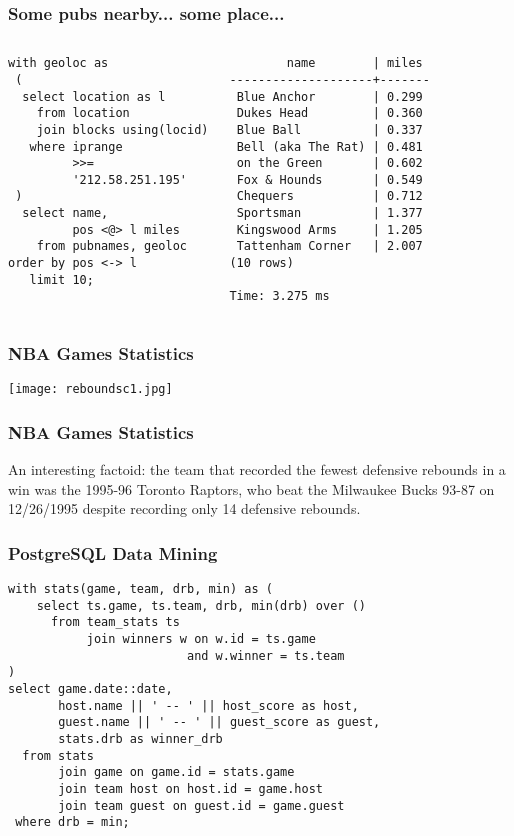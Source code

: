 \documentclass{beamer}
\begin{document}
\begin{frame}[fragile]
  \frametitle{Some pubs nearby... some place...}

\begin{columns}
\begin{verbatim}
with geoloc as
 (
  select location as l
    from location
    join blocks using(locid)
   where iprange
         >>=
         '212.58.251.195'
 )
  select name,
         pos <@> l miles
    from pubnames, geoloc
order by pos <-> l
   limit 10;
\end{verbatim}  
\begin{verbatim}
        name        | miles 
--------------------+-------
 Blue Anchor        | 0.299
 Dukes Head         | 0.360
 Blue Ball          | 0.337
 Bell (aka The Rat) | 0.481
 on the Green       | 0.602
 Fox & Hounds       | 0.549
 Chequers           | 0.712
 Sportsman          | 1.377
 Kingswood Arms     | 1.205
 Tattenham Corner   | 2.007
(10 rows)

Time: 3.275 ms
\end{verbatim}  
\end{columns}
\end{frame}

\begin{frame}
  \frametitle{NBA Games Statistics}

  \begin{center}
    \texttt{[image: reboundsc1.jpg]}
  \end{center}
\end{frame}

\begin{frame}
  \frametitle{NBA Games Statistics}

  An interesting factoid: the team that recorded the fewest defensive
  rebounds in a win was the 1995-96 Toronto Raptors, who beat the Milwaukee
  Bucks 93-87 on 12/26/1995 despite recording only 14 defensive rebounds.
\end{frame}

\begin{frame}[fragile]
  \frametitle{PostgreSQL Data Mining}

\begin{verbatim}
with stats(game, team, drb, min) as (
    select ts.game, ts.team, drb, min(drb) over ()
      from team_stats ts
           join winners w on w.id = ts.game
                         and w.winner = ts.team
)
select game.date::date,
       host.name || ' -- ' || host_score as host,
       guest.name || ' -- ' || guest_score as guest,
       stats.drb as winner_drb
  from stats
       join game on game.id = stats.game
       join team host on host.id = game.host
       join team guest on guest.id = game.guest
 where drb = min;
\end{verbatim}
\end{frame}
\end{document}
